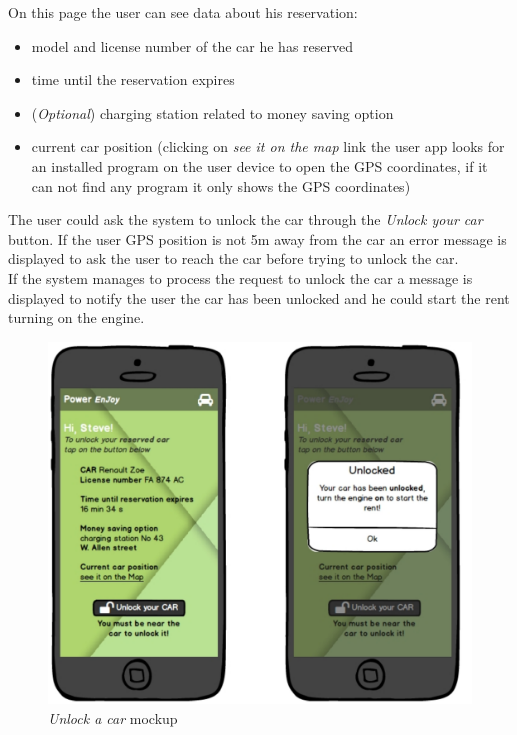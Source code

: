 On this page the user can see data about his reservation:
\begin{itemize}
	\item model and license number of the car he has reserved
	\item time until the reservation expires
	\item (\emph{Optional}) charging station related to money saving
	 option
	\item  current car position (clicking on \emph{see it on the map} link the user app looks for an installed program on the user device to open the GPS coordinates, if it can not find any program it only shows the GPS coordinates)
\end{itemize}

The user could ask the system to unlock the car through the \emph{Unlock your car} button. If the user GPS position is not 5m away from the car an error message is displayed to ask the user to reach the car before trying to unlock the car. \\

If the system manages to process the request to unlock the car a message is displayed to notify the user the car has been unlocked and he could start the rent turning on the engine.\\

\begin{figure}[h]
			\centering
			\includegraphics[width=0.9\linewidth]{mockups/unlockCar}
			\caption{
				\label{fig:unlockCar} 
				\emph{Unlock a car} mockup
			}
		\end{figure}

